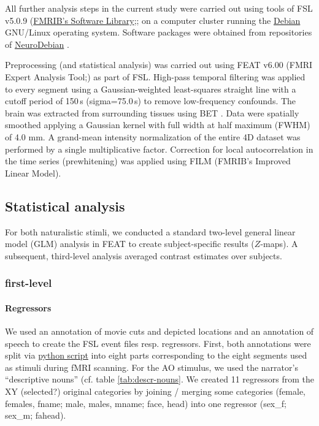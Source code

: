 \documentclass[english]{article}
\begin{document}

All further analysis steps in the current study were carried out using tools of FSL v5.0.9 (\href{''https://www.fmrib.ox.ac.uk/fsl''}{FMRIB's Software Library};\citep{smith2004fsl}; on a computer cluster running the \href{https://www.debian.org}{Debian} GNU/Linux operating system.
Software packages were obtained from repositories of \href{http://neuro.debian.net}{NeuroDebian} \citep{halchenko2012open}.

Preprocessing (and statistical analysis) was carried out using FEAT v6.00 (FMRI Expert Analysis Tool;\citep{woolrich2001autocorr}) as part of FSL.
High-pass temporal filtering was applied to every segment using a Gaussian-weighted least-squares straight line with a cutoff period of 150\,s (sigma=75.0\,s) to remove low-frequency confounds.
The brain was extracted from surrounding tissues using BET \citep{smith2002bet}.
Data were spatially smoothed applying a Gaussian kernel with full width at half maximum (FWHM) of 4.0 mm.
A grand-mean intensity normalization of the entire 4D dataset was performed by a single multiplicative factor.
Correction for local autocorrelation in the time series (prewhitening) was applied using FILM (FMRIB’s Improved Linear Model).

\subsection{Statistical analysis}
For both naturalistic stimli, we conducted a standard two-level general linear model (GLM) analysis in FEAT to create subject-specific results ($Z$-maps). A subsequent, third-level analysis averaged contrast estimates over subjects.

\subsubsection{first-level}
\paragraph{Regressors}
We used an annotation of movie cuts and depicted locations \citep{haeusler2016cutanno} and an annotation of speech \citep{haeusler2020speechanno} to create the FSL event files resp. regressors.
First, both annotations were split via \href{"https://github.com/chrhaeusler/studyforrest-data-annotations/blob/master/code/researchcut2segments.py"}{python script} into eight parts corresponding to the eight segments used as stimuli during fMRI scanning.
For the AO stimulus, we used the narrator's ``descriptive nouns'' (cf. table \ref{tab:descr-nouns}.
We created 11 regressors from the XY (selected?) original categories by joining / merging some categories (female, females, fname; male, males, mname; face, head) into one regressor (sex\_f; sex\_m; fahead).
\end{document}
